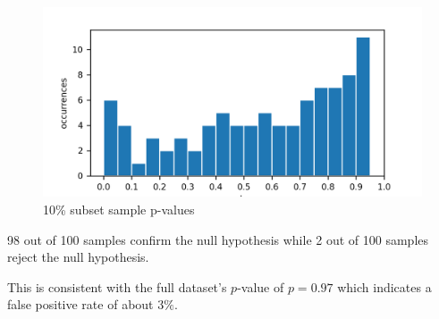 \documentclass[11pt]{article}
\begin{document}
\subsection{}  %
\begin{figure}[H]
    \centering
    \includegraphics[width=5in]{6ffig1.png}
    \caption{10\% subset sample p-values}
    \label{6ffig1}
\end{figure}
\begin{mdframed}
    98 out of 100 samples confirm the null hypothesis while 2 out of 100 samples
    reject the null hypothesis.
\end{mdframed}
This is consistent with the full dataset's $p$-value of $p=0.97$ which indicates
a false positive rate of about $3\%$.
\end{document}

